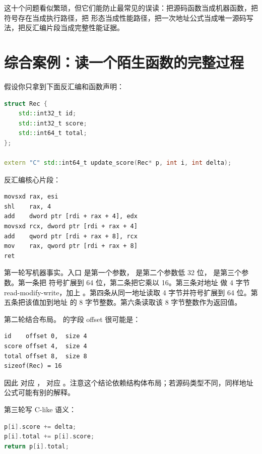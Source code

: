 这十个问题看似繁琐，但它们能防止最常见的误读：把源码函数当成机器函数，把符号存在当成执行路径，把  形态当成性能路径，把一次地址公式当成唯一源码写法，把反汇编片段当成完整性能证据。

\section{综合案例：读一个陌生函数的完整过程}

假设你只拿到下面反汇编和函数声明：

\begin{lstlisting}[language=C++]
struct Rec {
    std::int32_t id;
    std::int32_t score;
    std::int64_t total;
};

extern "C" std::int64_t update_score(Rec* p, int i, int delta);
\end{lstlisting}

反汇编核心片段：

\begin{lstlisting}
movsxd rax, esi
shl    rax, 4
add    dword ptr [rdi + rax + 4], edx
movsxd rcx, dword ptr [rdi + rax + 4]
add    qword ptr [rdi + rax + 8], rcx
mov    rax, qword ptr [rdi + rax + 8]
ret
\end{lstlisting}

第一轮写机器事实。入口  是第一个参数， 是第二个参数低 32 位， 是第三个参数。第一条把  符号扩展到 64 位，第二条把它乘以 16。第三条对地址  做 4 字节 read-modify-write，加上 。第四条从同一地址读取 4 字节并符号扩展到 64 位。第五条把该值加到地址  的 8 字节整数。第六条读取该 8 字节整数作为返回值。

第二轮结合布局。  的字段 offset 很可能是：

\begin{lstlisting}
id    offset 0,  size 4
score offset 4,  size 4
total offset 8,  size 8
sizeof(Rec) = 16
\end{lstlisting}

因此  对应 ， 对应 。注意这个结论依赖结构体布局；若源码类型不同，同样地址公式可能有别的解释。

第三轮写 C-like 语义：

\begin{lstlisting}[language=C++]
p[i].score += delta;
p[i].total += p[i].score;
return p[i].total;
\end{lstlisting}


